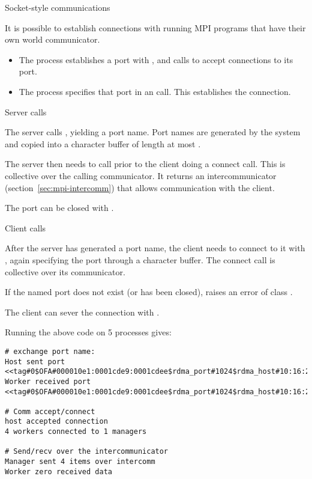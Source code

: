  {Socket-style communications}

It is possible to establish connections with running MPI programs that
have their own world communicator.
\begin{itemize}
\item The  process establishes a port with 
  , and calls  to accept
  connections to its port.
\item The  process specifies that port 
  in an  call. This establishes the connection.
\end{itemize}

 {Server calls}

The server calls , yielding a port name.
Port names are generated by the system and copied into a character
buffer of length at most .

The server then needs to call 
 prior to the client doing a connect call.
This is collective over the calling communicator.
It returns an intercommunicator (section~\ref{sec:mpi-intercomm})
that allows communication with the client.


The port can be closed with 
.

 {Client calls}

After the server has generated a port name, the client 
needs to connect to it with
, again specifying the port through a character buffer.
The connect call is collective over its communicator.


If the named port does not exist (or has been closed),
 raises an error of class .

The client can sever the connection with
.

Running the above code on 5 processes gives:
\begin{small}%
\begin{verbatim}
# exchange port name:
Host sent port <<tag#0$OFA#000010e1:0001cde9:0001cdee$rdma_port#1024$rdma_host#10:16:225:0:1:205:199:254:128:0:0:0:0:0:0$>>
Worker received port <<tag#0$OFA#000010e1:0001cde9:0001cdee$rdma_port#1024$rdma_host#10:16:225:0:1:205:199:254:128:0:0:0:0:0:0$>>

# Comm accept/connect
host accepted connection
4 workers connected to 1 managers

# Send/recv over the intercommunicator
Manager sent 4 items over intercomm
Worker zero received data  
\end{verbatim}
\end{small}%

